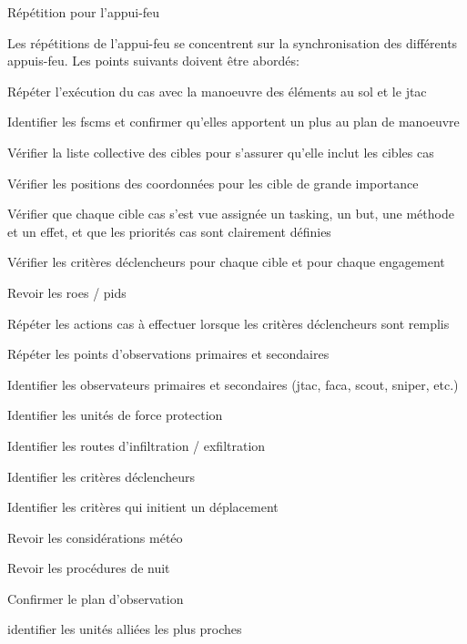 \begin{e1}
\begin{e2}
\begin{e3}
		\end{e3}
	\end{e2}
	\item Répétition pour l'appui-feu
	\begin{e2}
		\item Les répétitions de l'appui-feu se concentrent sur la synchronisation des différents appuis-feu. Les points suivants doivent être abordés:
		\begin{e3}
			\item Répéter l'exécution du \gls{cas} avec la manoeuvre des éléments au sol et le \gls{jtac}
			\item Identifier les \glspl{fscm} et confirmer qu'elles apportent un plus au plan de manoeuvre
			\item Vérifier la liste collective des cibles pour s'assurer qu'elle inclut les cibles \gls{cas}
			\item Vérifier les positions des coordonnées pour les cible de grande importance
			\item Vérifier que chaque cible \gls{cas} s'est vue assignée un tasking, un but, une méthode et un effet, et que les priorités \gls{cas} sont clairement définies
			\item Vérifier les critères déclencheurs pour chaque cible et pour chaque engagement
			\item Revoir les \glspl{roe} / \glspl{pid}
			\item Répéter les actions \gls{cas} à effectuer lorsque les critères déclencheurs sont remplis
			\item Répéter les points d'observations primaires et secondaires
			\begin{e4}
				\item Identifier les observateurs primaires et secondaires (\gls{jtac}, \gls{faca}, scout, sniper, etc.)
				\item Identifier les unités de force protection
				\item Identifier les routes d'infiltration / exfiltration
				\item Identifier les critères déclencheurs
				\item Identifier les critères qui initient un déplacement
				\item Revoir les considérations météo
				\item Revoir les procédures de nuit
				\item Confirmer le plan d'observation				
			\end{e4}
			\item identifier les unités alliées les plus proches

\end{e3}
\end{e2}
\end{e1}

